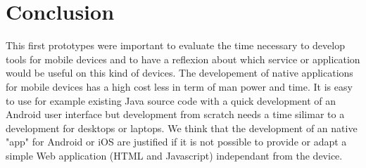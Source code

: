 \documentclass[11pt,twoside]{article}
\begin{document}
\section{Conclusion}
This first prototypes were important to evaluate the time necessary to develop tools for mobile devices and to have a reflexion about which service or application would be useful on this kind of devices. The developement of native applications for mobile devices has a high cost less in term of man power and time. It is easy to use for example existing Java source code with a quick development of an Android user interface but development from scratch needs a time silimar to a development for desktops or laptops. We think that the development of an native "app" for Android or iOS are justified if it is not possible to provide or adapt a simple Web application (HTML and Javascript)  independant from the device.


\end{document}
